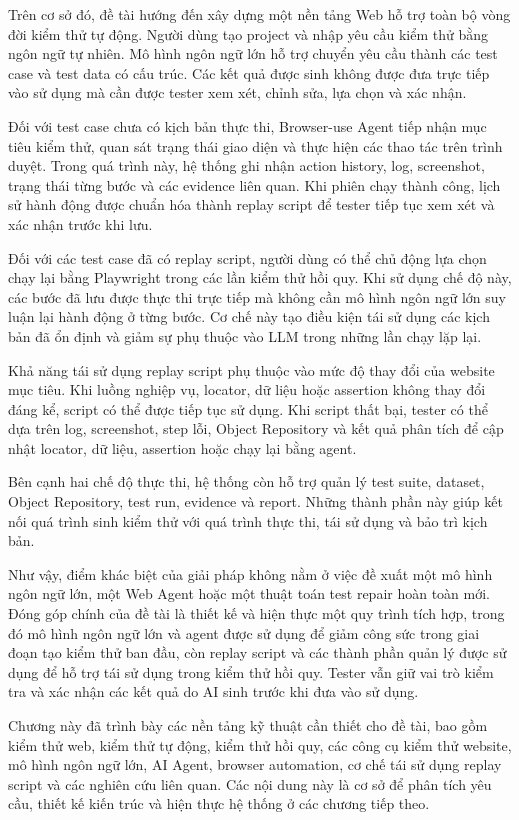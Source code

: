 Trên cơ sở đó, đề tài hướng đến xây dựng một nền tảng Web hỗ trợ toàn bộ vòng đời kiểm thử tự động. Người dùng tạo project và nhập yêu cầu kiểm thử bằng ngôn ngữ tự nhiên. Mô hình ngôn ngữ lớn hỗ trợ chuyển yêu cầu thành các test case và test data có cấu trúc. Các kết quả được sinh không được đưa trực tiếp vào sử dụng mà cần được tester xem xét, chỉnh sửa, lựa chọn và xác nhận.

Đối với test case chưa có kịch bản thực thi, Browser-use Agent tiếp nhận mục tiêu kiểm thử, quan sát trạng thái giao diện và thực hiện các thao tác trên trình duyệt. Trong quá trình này, hệ thống ghi nhận action history, log, screenshot, trạng thái từng bước và các evidence liên quan. Khi phiên chạy thành công, lịch sử hành động được chuẩn hóa thành replay script để tester tiếp tục xem xét và xác nhận trước khi lưu.

Đối với các test case đã có replay script, người dùng có thể chủ động lựa chọn chạy lại bằng Playwright trong các lần kiểm thử hồi quy. Khi sử dụng chế độ này, các bước đã lưu được thực thi trực tiếp mà không cần mô hình ngôn ngữ lớn suy luận lại hành động ở từng bước. Cơ chế này tạo điều kiện tái sử dụng các kịch bản đã ổn định và giảm sự phụ thuộc vào LLM trong những lần chạy lặp lại.

Khả năng tái sử dụng replay script phụ thuộc vào mức độ thay đổi của website mục tiêu. Khi luồng nghiệp vụ, locator, dữ liệu hoặc assertion không thay đổi đáng kể, script có thể được tiếp tục sử dụng. Khi script thất bại, tester có thể dựa trên log, screenshot, step lỗi, Object Repository và kết quả phân tích để cập nhật locator, dữ liệu, assertion hoặc chạy lại bằng agent.

Bên cạnh hai chế độ thực thi, hệ thống còn hỗ trợ quản lý test suite, dataset, Object Repository, test run, evidence và report. Những thành phần này giúp kết nối quá trình sinh kiểm thử với quá trình thực thi, tái sử dụng và bảo trì kịch bản.

Như vậy, điểm khác biệt của giải pháp không nằm ở việc đề xuất một mô hình ngôn ngữ lớn, một Web Agent hoặc một thuật toán test repair hoàn toàn mới. Đóng góp chính của đề tài là thiết kế và hiện thực một quy trình tích hợp, trong đó mô hình ngôn ngữ lớn và agent được sử dụng để giảm công sức trong giai đoạn tạo kiểm thử ban đầu, còn replay script và các thành phần quản lý được sử dụng để hỗ trợ tái sử dụng trong kiểm thử hồi quy. Tester vẫn giữ vai trò kiểm tra và xác nhận các kết quả do AI sinh trước khi đưa vào sử dụng.

Chương này đã trình bày các nền tảng kỹ thuật cần thiết cho đề tài, bao gồm kiểm thử web, kiểm thử tự động, kiểm thử hồi quy, các công cụ kiểm thử website, mô hình ngôn ngữ lớn, AI Agent, browser automation, cơ chế tái sử dụng replay script và các nghiên cứu liên quan. Các nội dung này là cơ sở để phân tích yêu cầu, thiết kế kiến trúc và hiện thực hệ thống ở các chương tiếp theo.
